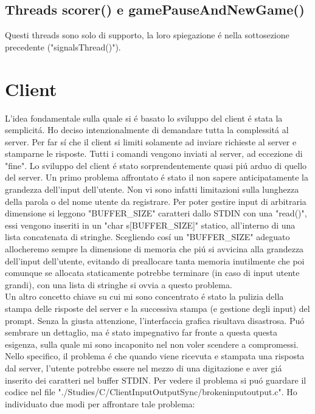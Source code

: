  \subsection{Threads scorer() e gamePauseAndNewGame()}
 
 Questi threads sono solo di supporto, la loro spiegazione \'e nella sottosezione precedente ("signalsThread()").

\section{Client}
L'idea fondamentale sulla quale si \'e basato lo sviluppo del client \'e stata la semplicit\'a. Ho deciso intenzionalmente di demandare tutta la complessit\'a al server. Per far s\'i che il client si limiti solamente ad inviare richieste al server e stamparne le risposte. Tutti i  comandi vengono inviati al server, ad eccezione di "fine". Lo sviluppo del client \'e stato sorprendentemente quasi pi\'u arduo di quello del server. Un primo problema affrontato \'e stato il non sapere anticipatamente la grandezza dell'input dell'utente. Non vi sono infatti limitazioni sulla lunghezza della parola o del nome utente da registrare. Per poter gestire input di arbitraria dimensione si leggono "BUFFER\_SIZE" caratteri dallo STDIN con una "read()", essi vengono inseriti in un "char s[BUFFER\_SIZE]" statico, all'interno di una lista concatenata di stringhe. Scegliendo cos\'i un "BUFFER\_SIZE" adeguato allocheremo sempre la dimensione di memoria che pi\'u si avvicina alla grandezza dell'input dell'utente, evitando di preallocare tanta memoria inutilmente che poi comunque se allocata staticamente potrebbe terminare (in caso di input utente grandi), con una lista di stringhe si ovvia a questo problema.
\\
Un altro concetto chiave su cui mi sono concentrato \'e stato la pulizia della stampa delle risposte del server e la successiva stampa (e gestione degli input) del prompt. Senza la giusta attenzione, l'interfaccia grafica risultava disastrosa. Pu\'o sembrare un dettaglio, ma \'e stato impegnativo far fronte a questa questa esigenza, sulla quale mi sono incaponito nel non voler scendere a compromessi. Nello specifico, il problema \'e che quando viene ricevuta e stampata una risposta dal server, l'utente potrebbe essere nel mezzo di una digitazione e aver gi\'a inserito dei caratteri nel buffer STDIN. Per vedere il problema si pu\'o guardare il codice nel file "./Studies/C/ClientInputOutputSync/brokeninputoutput.c". Ho individuato due modi per affrontare tale problema:
